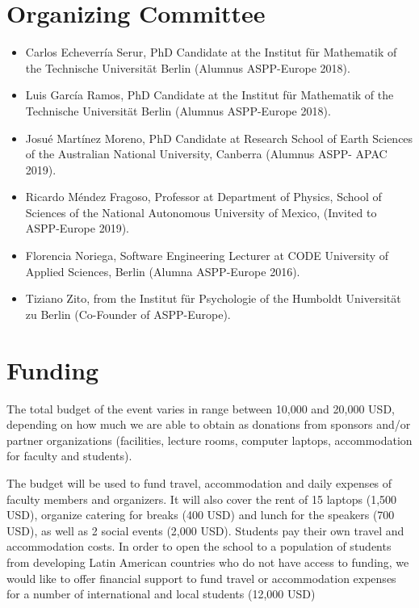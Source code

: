 \documentclass{article}[11pt]
\begin{document}
\section*{Organizing Committee}
\begin{itemize}
\item Carlos Echeverr\'ia Serur, PhD Candidate at the Institut f\"ur
Mathematik of the Technische Universit\"at Berlin (Alumnus ASPP-Europe
2018).

\item Luis Garc\'ia Ramos, PhD Candidate at the Institut f\"ur Mathematik
of the Technische Universit\"at Berlin (Alumnus ASPP-Europe 2018).

\item Josu\'e Mart\'inez Moreno, PhD Candidate at Research School of Earth
Sciences of the Australian National University, Canberra (Alumnus ASPP-
APAC 2019).

\item Ricardo M\'endez Fragoso, Professor at Department of Physics, School
of Sciences of the National Autonomous University of Mexico, (Invited to
ASPP-Europe 2019).

\item Florencia Noriega, Software Engineering Lecturer at CODE University
of Applied Sciences, Berlin (Alumna ASPP-Europe 2016).

\item Tiziano Zito, from the Institut f\"ur Psychologie of the Humboldt
Universit\"at zu Berlin (Co-Founder of ASPP-Europe).
\end{itemize}

\section*{Funding}
The total budget of the event varies in range between 10,000 and 20,000 USD,
depending on how much we are able to obtain as donations from sponsors and/or
partner organizations (facilities, lecture rooms, computer laptops,
accommodation for faculty and students).

The budget will be used to fund travel, accommodation and daily expenses of
faculty members and organizers. It will also cover the rent of 15 laptops
(1,500 USD), organize catering for breaks (400 USD) and lunch for the speakers
(700 USD), as well as 2 social events (2,000 USD). Students pay their own
travel and accommodation costs. In order to open the school to a population of
students from developing Latin American countries who do not have access to
funding, we would like to offer financial support to fund travel or
accommodation expenses for a number of international and local students (12,000
USD)
\end{document}
